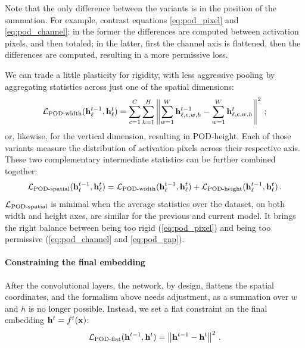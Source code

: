 Note that the only difference between the variants is in the position of the summation. For example,
contrast equations \autoref{eq:pod_pixel} and \ref{eq:pod_channel}: in the former the differences
are computed between activation pixels, and then totaled; in the latter, first the channel axis is
flattened, then the differences are computed, resulting in a more permissive loss.

We can trade a little plasticity for rigidity, with less aggressive pooling by aggregating
statistics across just one of the spatial dimensions:
%
\begin{equation}
    \mathcal{L}_{\text{POD-width}}(\mathbf{h}^{t-1}_\ell, \mathbf{h}^t_\ell)  = \sum_{c=1}^{C} \sum_{h=1}^{H} \left\Vert \sum_{w=1}^W \mathbf{h}^{t-1}_{\ell,c,w,h} - \sum_{w=1}^W \mathbf{h}^{t}_{\ell,c,w,h} \right\Vert^2\label{eq:pod_width}\,;
\end{equation}
%
or, likewise, for the vertical dimension, resulting in POD-height. Each of those variants measure
the distribution of activation pixels across their respective axis. These two complementary
intermediate statistics can be further combined together:
%
\begin{equation}
    \mathcal{L}_{\text{POD-spatial}}(\mathbf{h}^{t-1}_\ell, \mathbf{h}^t_\ell) = \mathcal{L}_{\text{POD-width}}(\mathbf{h}^{t-1}_\ell, \mathbf{h}^t_\ell) + \mathcal{L}_{\text{POD-height}}(\mathbf{h}^{t-1}_\ell, \mathbf{h}^t_\ell)\,.
\end{equation}
%
$\mathcal{L}_{\text{POD-spatial}}$ is minimal when the average statistics over the dataset, on both width
and height axes, are similar for the previous and current model. It brings the right balance between
being too rigid (\autoref{eq:pod_pixel}) and being too permissive (\autoref{eq:pod_channel} and
\ref{eq:pod_gap}).

\label{sec:pod_flat}
\paragraph{Constraining the final embedding} After the convolutional layers, the network, by design,
flattens the spatial coordinates, and the formalism above needs adjustment, as a summation over $w$
and $h$ is no longer possible. Instead, we set a flat constraint on the final embedding $\mathbf{h}^{t} =
    f^{t}(\mathbf{x})$:
%
\begin{equation}
    \mathcal{L}_{\text{POD-flat}}(\mathbf{h}^{t-1}, \mathbf{h}^t) = \left\Vert \mathbf{h}^{t-1} - \mathbf{h}^t \right\Vert^2\label{eq:POD-flat}\,.
\end{equation}

